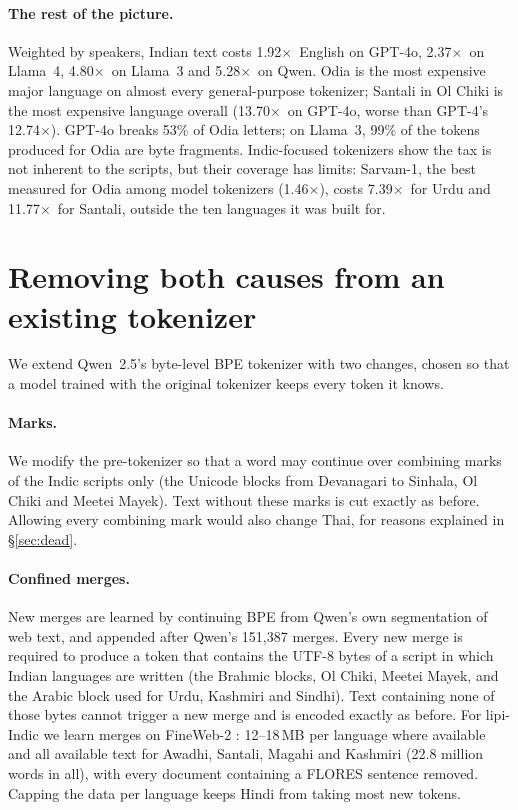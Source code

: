 \documentclass[11pt]{article}
\newcommand{\x}{$\times$}
\begin{document}
\paragraph{The rest of the picture.} Weighted by speakers, Indian text costs 1.92\x\ English on
GPT-4o, 2.37\x\ on Llama~4, 4.80\x\ on Llama~3 and 5.28\x\ on Qwen. Odia is the most expensive major
language on almost every general-purpose tokenizer; Santali in Ol Chiki is the most expensive
language overall (13.70\x\ on GPT-4o, worse than GPT-4's 12.74\x). GPT-4o breaks 53\% of Odia
letters; on Llama~3, 99\% of the tokens produced for Odia are byte fragments. Indic-focused
tokenizers show the tax is not inherent to the scripts, but their coverage has limits: Sarvam-1, the
best measured for Odia among model tokenizers (1.46\x), costs 7.39\x\ for Urdu and 11.77\x\ for
Santali, outside the ten languages it was built for.

\section{Removing both causes from an existing tokenizer}
\label{sec:fix}

We extend Qwen~2.5's byte-level BPE tokenizer \citep{qwen2025qwen25} with two changes, chosen so that
a model trained with the original tokenizer keeps every token it knows.

\paragraph{Marks.} We modify the pre-tokenizer so that a word may continue over combining marks of
the Indic scripts only (the Unicode blocks from Devanagari to Sinhala, Ol Chiki and Meetei Mayek). Text without
these marks is cut exactly as before. Allowing every combining mark would also change Thai, for
reasons explained in \S\ref{sec:dead}.

\paragraph{Confined merges.} New merges are learned by continuing BPE from Qwen's own segmentation of
web text, and appended after Qwen's 151,387 merges. Every new merge is required to produce a token
that contains the UTF-8 bytes of a script in which Indian languages are written (the Brahmic blocks,
Ol Chiki, Meetei Mayek, and the Arabic block used for Urdu, Kashmiri and Sindhi). Text containing none
of those bytes cannot trigger a new merge and is encoded exactly as before. For lipi-Indic we learn merges on FineWeb-2
\citep{penedo2025fineweb2}: 12--18\,MB per language where available and all available text for
Awadhi, Santali, Magahi and Kashmiri (22.8 million words in all), with every document containing a
FLORES sentence removed. Capping the data per language keeps Hindi from taking most new tokens.
\end{document}
